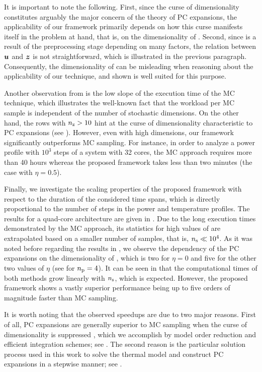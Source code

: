 It is important to note the following. First, since the curse of dimensionality
constitutes arguably the major concern of the theory of PC expansions, the
applicability of our framework primarily depends on how this curse manifests
itself in the problem at hand, that is, on the dimensionality \nz of \vz.
Second, since \vz is a result of the preprocessing stage depending on many
factors, the relation between $\boldsymbol{u}$ and $\boldsymbol{z}$ is not straightforward, which is
illustrated in the previous paragraph. Consequently, the dimensionality of \vu
can be misleading when reasoning about the applicability of our technique, and
\nz shown  is well suited for this purpose.

Another observation from  is the low slope of
the execution time of the MC technique, which illustrates the well-known fact
that the workload per MC sample is independent of the number of stochastic
dimensions. On the other hand, the rows with ${n_\mathrm{z}} > 10$ hint at the curse of
dimensionality characteristic to PC expansions (see
). However, even with high dimensions, our
framework significantly outperforms MC sampling. For instance, in order to
analyze a power profile with $10^3$ steps of a system with 32 cores, the MC
approach requires more than 40 hours whereas the proposed framework takes less
than two minutes (the case with $\eta = 0.5$).

Finally, we investigate the scaling properties of the proposed framework with
respect to the duration of the considered time spans, which is directly
proportional to the number of steps \ns in the power and temperature profiles.
The results for a quad-core architecture are given in .
Due to the long execution times demonstrated by the MC approach, its statistics
for high values of \ns are extrapolated based on a smaller number of samples,
that is, ${n_\mathrm{s}} \ll 10^4$. As it was noted before regarding the results in
, we observe the dependency of the PC expansions
on the dimensionality \nz of \vz, which is two for $\eta = 0$ and five for the
other two values of $\eta$ (see  for ${n_\mathrm{p}} = 4$).
It can be seen in  that the computational times of both
methods grow linearly with ${n_\mathrm{s}}$, which is expected. However, the proposed
framework shows a vastly superior performance being up to five orders of
magnitude faster than MC sampling.

It is worth noting that the observed speedups are due to two major reasons.
First of all, PC expansions are generally superior to MC sampling when the curse
of dimensionality is suppressed \cite{xiu2010, eldred2008}, which we accomplish
by model order reduction and efficient integration schemes; see
. The second reason is the particular solution
process used in this work to solve the thermal model and construct PC expansions
in a stepwise manner; see .

